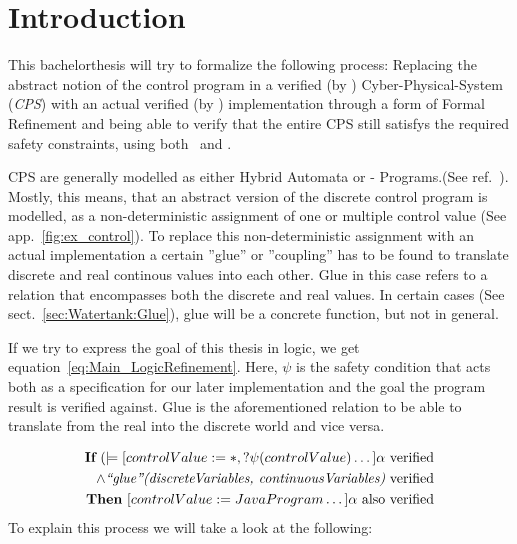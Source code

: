 
\chapter{Introduction}
\label{ch:Introduction}

This bachelorthesis will try to formalize the following process: Replacing the abstract notion of the control program in a verified (by \keym) Cyber-Physical-System (\textit{CPS}) with an actual verified (by \key) implementation through a form of Formal Refinement and being able to verify that the entire CPS still satisfys the required safety constraints, using both \keym~and \key. 

CPS are generally modelled as either Hybrid Automata or - Programs.(See ref.~\cite{platzer2010b}). Mostly, this means, that an abstract version of the discrete control program is modelled, as a non-deterministic assignment of one or multiple control value (See app.~\ref{fig:ex_control}). To replace this non-deterministic assignment with an actual implementation a certain ''glue'' or ''coupling'' has to be found to translate discrete and real continous values into each other. Glue in this case refers to a relation that encompasses both the discrete and real values. In certain cases (See sect.~\ref{sec:Watertank:Glue}), glue will be a concrete function, but not in general.

If we try to express the goal of this thesis in logic, we get equation~\ref{eq:Main_LogicRefinement}. Here, \(\psi\) is the safety condition that acts both as a specification for our later implementation and the goal the program result is verified against. Glue is the aforementioned relation to be able to translate from the real into the discrete world and vice versa.

\begin{equation}
\centering
\begin{split}
\textbf{If}~ (\models [ controlValue := \ast, ?\psi(controlValue) \dots] \alpha~\textrm{verified} \\ \wedge \textit{``glue''(discreteVariables, continuousVariables)}~\textrm{verified} \\
\textbf{Then}~ [controlValue := JavaProgram \dots] \alpha~\textrm{also verified}
\end{split}
\label{eq:Main_LogicRefinement}
\end{equation} To explain this process we will take a look at the following: 

